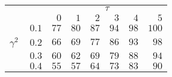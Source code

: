 \begin{tabular}{r|rrrrrr}
\hline\hline
 &\multicolumn{6}{c}{$\tau$} \\ 
  & $0$ & $1$ & $2$ & $3$ & $4$ & $5$ \\ 
 \hline$0.1$ & $ 77$ & $ 80$ & $ 87$ & $ 94$ & $ 98$ & $100$\\ 
$\gamma^2\;\;\;$ $0.2$ & $ 66$ & $ 69$ & $ 77$ & $ 86$ & $ 93$ & $ 98$\\ 
$0.3$ & $ 60$ & $ 62$ & $ 69$ & $ 79$ & $ 88$ & $ 94$\\ 
$0.4$ & $ 55$ & $ 57$ & $ 64$ & $ 73$ & $ 83$ & $ 90$\\ 
 \hline 
 \end{tabular}